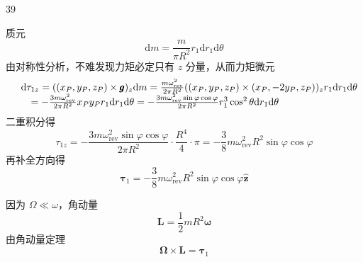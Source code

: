 \begin{solution}{39}
\begin{subsolution}
\begin{subsubsolution}
            质元
            \begin{equation}
                \mathrm{d} m = \frac {m}{\pi R ^ {2}} r _ {1} \mathrm{d} r _ {1} \mathrm{d} \theta
                \label{eq:7.s39}
            \end{equation}
            由对称性分析，不难发现力矩必定只有 $z$ 分量，从而力矩微元
            \begin{equation}
                \begin{array}{r l} & {\mathrm{d} \tau_ {1 z} = ((x _ {P}, y _ {P}, z _ {P}) \times \pmb {g}) _ {z} \mathrm{d} m = \frac {m \omega_ {\mathrm{rev}} ^ {2}}{2 \pi R ^ {2}} ((x _ {P}, y _ {P}, z _ {P}) \times (x _ {P}, - 2 y _ {P}, z _ {P})) _ {z} r _ {1} \mathrm{d} r _ {1} \mathrm{d} \theta} \\ & {\quad = - \frac {3 m \omega_ {\mathrm{rev}} ^ {2}}{2 \pi R ^ {2}} x _ {P} y _ {P} r _ {1} \mathrm{d} r _ {1} \mathrm{d} \theta = - \frac {3 m \omega_ {\mathrm{rev}} ^ {2} \sin \varphi \cos \varphi}{2 \pi R ^ {2}} r _ {1} ^ {3} \cos^ {2} \theta \mathrm{d} r _ {1} \mathrm{d} \theta} \end{array}
                \label{eq:8.s39}
            \end{equation}
            二重积分得
            \begin{equation}
                \tau_ {1 z} = - \frac {3 m \omega_ {\mathrm{rev}} ^ {2} \sin \varphi \cos \varphi}{2 \pi R ^ {2}} \cdot \frac {R ^ {4}}{4} \cdot \pi = - \frac {3}{8} m \omega_ {\mathrm{rev}} ^ {2} R ^ {2} \sin \varphi \cos \varphi
                \label{eq:9.s39}
            \end{equation}
            再补全方向得
            \begin{equation}
                \pmb {\tau} _ {1} = - \frac {3}{8} m \omega_ {\mathrm{rev}} ^ {2} R ^ {2} \sin \varphi \cos \varphi \hat {\pmb {z}}
                \label{eq:10.s39}
            \end{equation}
        \end{subsubsolution}
        \begin{subsubsolution}
            因为 $\Omega \ll \omega$，角动量
            \begin{equation}
                \pmb {L} = \frac {1}{2} m R ^ {2} \pmb {\omega}
                \label{eq:11.s39}
            \end{equation}
            由角动量定理
            \begin{equation}
                \boldsymbol {\Omega} \times \boldsymbol {L} = \boldsymbol {\tau} _ {1}
                \label{eq:12.s39}

\end{equation}
\end{subsubsolution}
\end{subsolution}
\end{solution}
